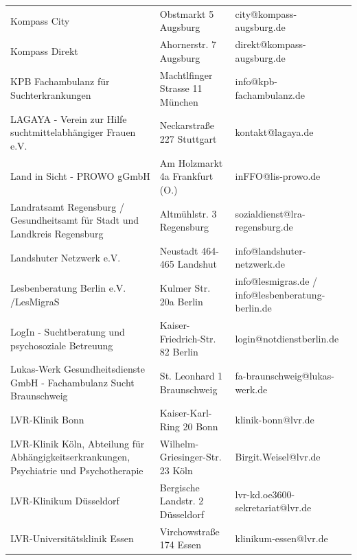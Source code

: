 {\begin{xltabular}{\textwidth} {
 >{\raggedright\arraybackslash}p{5cm}
 >{\raggedright\arraybackslash}X
 >{\raggedright\arraybackslash}p{5cm} }
Kompass City & Obstmarkt 5 Augsburg & city@kompass-augsburg.de \\
Kompass Direkt & Ahornerstr. 7 Augsburg & direkt@kompass-augsburg.de \\
KPB Fachambulanz für Suchterkrankungen & Machtlfinger Strasse 11 München & info@kpb-fachambulanz.de \\
LAGAYA - Verein zur Hilfe suchtmittelabhängiger Frauen e.V. & Neckarstraße 227 Stuttgart & kontakt@lagaya.de \\
Land in Sicht - PROWO gGmbH & Am Holzmarkt 4a Frankfurt (O.) & inFFO@lis-prowo.de \\
Landratsamt Regensburg / Gesundheitsamt für Stadt und Landkreis Regensburg & Altmühlstr. 3 Regensburg & sozialdienst@lra-regensburg.de \\
Landshuter Netzwerk e.V. & Neustadt 464-465 Landshut & info@landshuter-netzwerk.de \\
Lesbenberatung Berlin e.V. /LesMigraS & Kulmer Str. 20a Berlin & info@lesmigras.de / info@lesbenberatung-berlin.de \\
LogIn - Suchtberatung und psychosoziale Betreuung & Kaiser-Friedrich-Str. 82 Berlin & login@notdienstberlin.de \\
Lukas-Werk Gesundheitsdienste GmbH - Fachambulanz Sucht Braunschweig & St. Leonhard 1 Braunschweig & fa-braunschweig@lukas-werk.de \\
LVR-Klinik Bonn & Kaiser-Karl-Ring 20 Bonn & klinik-bonn@lvr.de \\
LVR-Klinik Köln, Abteilung für Abhängigkeitserkrankungen, Psychiatrie und Psychotherapie & Wilhelm-Griesinger-Str. 23 Köln & Birgit.Weisel@lvr.de \\
LVR-Klinikum Düsseldorf & Bergische Landstr. 2 Düsseldorf & lvr-kd.oe3600-sekretariat@lvr.de \\
LVR-Universitätsklinik Essen & Virchowstraße 174 Essen & klinikum-essen@lvr.de \\

\end{xltabular}}
